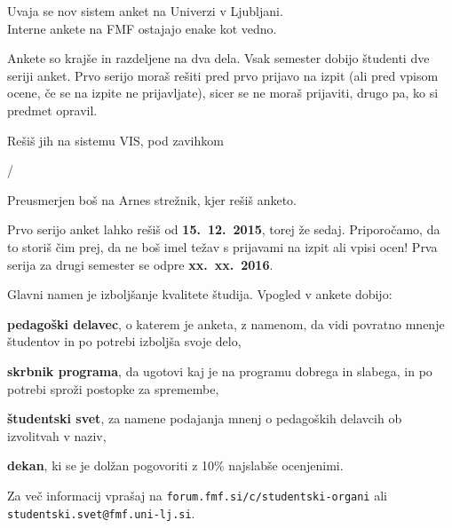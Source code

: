 \documentclass[oneside, 12pt]{article}
\title{\Title}
\author{\Author}
\date{\today}
\theoremstyle{definition}
\newenvironment{itemize*}{\vspace{-6pt}\begin{itemize}\setlength{\itemsep}{0pt}\setlength{\parskip}{2pt}}{\end{itemize}}
\newcommand{\veliko}[1]{\scalebox{3}{\textbf{#1}}}
\newcommand{\srednje}[1]{\scalebox{2.4}{#1}}
\begin{document}
\Huge

\veliko{Kaj}\srednje{ se dogaja?}

Uvaja se nov sistem anket na Univerzi v Ljubljani. \\
Interne ankete na FMF ostajajo enake kot vedno.

\vspace{12pt}
\veliko{Kakšne}\srednje{ so nove ankete?}

Ankete so krajše in razdeljene na dva dela. Vsak semester dobijo študenti dve
seriji anket. Prvo serijo moraš rešiti pred prvo prijavo na izpit (ali
pred vpisom ocene, če se na izpite ne prijavljate), sicer se ne moraš prijaviti,
drugo pa, ko si predmet opravil.

\vspace{12pt}
\veliko{Kje}\srednje{ jih lahko rešim?}

Rešiš jih na sistemu VIS, pod zavihkom
\begin{center}
\vspace{-16pt}
 / 
\end{center}
\vspace{-12pt}
Preusmerjen boš na Arnes strežnik, kjer rešiš anketo.

\vspace{12pt}
\veliko{Kdaj}\srednje{ jih moram rešiti?}

Prvo serijo anket lahko rešiš od \textbf{15.~12.~2015}, torej že sedaj.
Priporočamo, da to storiš čim prej, da ne boš imel težav s prijavami na izpit
ali vpisi ocen! Prva serija za drugi semester se odpre \textbf{xx.~xx.~2016}.

\vspace{12pt}
\veliko{Zakaj}\srednje{ so pomembne?}

Glavni namen je izboljšanje kvalitete študija.
Vpogled v ankete dobijo:
\vspace{-12pt}
\begin{itemize*}
  \item \textbf{pedagoški delavec}, o katerem je anketa, z namenom, da vidi povratno mnenje
    študentov in po potrebi izboljša svoje delo,
  \item \textbf{skrbnik programa}, da ugotovi kaj je na programu dobrega in slabega, in
    po potrebi sproži postopke za spremembe,
  \item \textbf{študentski svet}, za namene podajanja mnenj o pedagoških delavcih ob
    izvolitvah v naziv,
  \item \textbf{dekan}, ki se je dolžan pogovoriti z 10\% najslabše ocenjenimi.
\end{itemize*}

Za več informacij vprašaj na \texttt{forum.fmf.si/c/studentski-organi} ali
\texttt{studentski.svet@fmf.uni-lj.si}.

\end{document}
